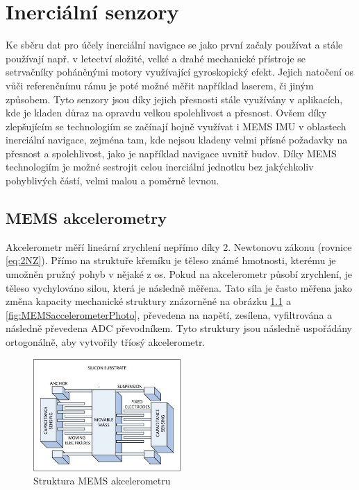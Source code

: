 \chapter{Inerciální senzory}
Ke sběru dat pro účely inerciální navigace se jako první začaly používat a stále používají např. v letectví složité, velké a drahé mechanické přístroje se setrvačníky poháněnými motory využívající gyroskopický efekt. Jejich natočení os vůči referenčnímu rámu je poté možné měřit například laserem, či jiným způsobem. Tyto senzory jsou díky jejich přesnosti stále využívány v aplikacích, kde je kladen důraz na opravdu velkou spolehlivost a přesnost. Ovšem díky zlepšujícím se technologiím se začínají hojně využívat i \ac{MEMS} \ac{IMU} v oblastech inerciální navigace, zejména tam, kde nejsou kladeny velmi přísné požadavky na přesnost a spolehlivost, jako je například navigace uvnitř budov. Díky \ac{MEMS} technologiím je možné sestrojit celou inerciální jednotku bez jakýchkoliv pohyblivých částí, velmi malou a poměrně levnou. \cite{Tittertonc2004} \cite{Grewal2013}

\section{MEMS akcelerometry} \label{MEMSaccel}
Akcelerometr měří lineární zrychlení nepřímo díky 2. Newtonovu zákonu (rovnice \ref{eq:2NZ}). Přímo na struktuře křemíku je těleso známé hmotnosti, kterému je umožněn pružný pohyb v nějaké z os. Pokud na akcelerometr působí zrychlení, je těleso vychylováno silou, která je následně měřena. Tato síla je často měřena jako změna kapacity mechanické struktury znázorněné na obrázku \ref{fig:MEMSaccelerometer} a \ref{fig:MEMSaccelerometerPhoto}, převedena na napětí, zesílena, vyfiltrována a následně převedena \ac{ADC} převodníkem.
Tyto struktury jsou následně uspořádány ortogonálně, aby vytvořily tříosý akcelerometr. \cite{Dadafshar2014}

\begin{figure}[h]
    \centering
    \includegraphics[width=0.5\textwidth]{obrazky/MEMSaccelerometer}
    \caption{Struktura MEMS akcelerometru \cite{Dadafshar2014}}
    \label{fig:MEMSaccelerometer}
\end{figure}

